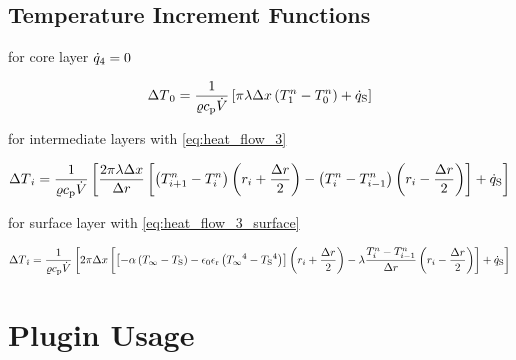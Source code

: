 \documentclass{scrartcl}
\begin{document}
    \subsection{Temperature Increment Functions}

    for core layer ${\dot{q}}_4 = 0$

    \begin{equation}
        {\Delta T}_0 = \frac{1}{{\varrho}{c_\mathrm{p}}{\dot{V}}} \left[ \pi {\lambda} {\Delta x} \left( {T}_1^{n} - {T}_0^{n} \right) + {\dot{q}_\mathrm{S}} \right]
        \label{eq:increment_core}
    \end{equation}

    for intermediate layers with \autoref{eq:heat_flow_3}
    
    \begin{equation}
        {\Delta T}_{i} = \frac{1}{{\varrho}{c_\mathrm{p}}{\dot{V}}}
        \left[
            \frac{2 \pi {\lambda} {\Delta x}}{{\Delta r}} \left[
            \left( {T}_{{i}+1}^{n} - {T}_{i}^{n} \right)
                \left( {r}_{i} + \frac{{\Delta r}}{2} \right)
            -\left( {T}_{{i}}^{n} - {T}_{{i}-1}^{n} \right)
            \left( {r}_{i} - \frac{{\Delta r}}{2} \right)
            \right]
        + {\dot{q}_\mathrm{S}}
        \right]
        \label{eq:increment_layer}
    \end{equation}

    for surface layer with \autoref{eq:heat_flow_3_surface}
    
    \begin{equation}
        {\Delta T}_{\hat{\imath}} = \frac{1}{{\varrho}{c_\mathrm{p}}{\dot{V}}}
        \left[
         2 \pi {\Delta x} \left[
            \left[ -{\alpha} \left( {T_\infty} - {T_\mathrm{S}} \right) - {\epsilon_0}{\epsilon_\mathrm{r}}\left( {T_\infty}^4 - {T_\mathrm{S}}^4 \right) \right]
            \left( {r}_{i} + \frac{{\Delta r}}{2} \right)
            -{\lambda} \frac{{T}_{{i}}^{n} - {T}_{{i}-1}^{n}}{{\Delta r}}
            \left( {r}_{i} - \frac{{\Delta r}}{2} \right)
            \right]
        + {\dot{q}_\mathrm{S}}
        \right]
        \label{eq:increment_surface}
    \end{equation}


    \section{Plugin Usage}\label{sec:plugin-usage}

    

    \printbibliography
\end{document}
